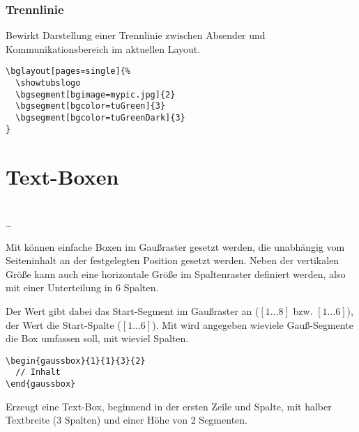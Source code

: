 \subsubsection{Trennlinie}

\vspace*{-5mm}
\begin{Declaration}
\end{Declaration}

Bewirkt Darstellung einer Trennlinie zwischen Absender und Kommunikationsbereich
im aktuellen Layout.

\begin{lstlisting}[captionpos=b,caption={Beispiel-Nutzung von bglayout},label=listing:bglayout]
\bglayout[pages=single]{%
  \showtubslogo
  \bgsegment[bgimage=mypic.jpg]{2}
  \bgsegment[bgcolor=tuGreen]{3}
  \bgsegment[bgcolor=tuGreenDark]{3}
}
\end{lstlisting}


\section{Text-Boxen}

\begin{Declaration}
          \\
  \quad\dots\\
\end{Declaration}

Mit  können einfache Boxen im Gaußraster gesetzt werden,
die unabhängig vom Seiteninhalt an der festgelegten Position gesetzt werden.
Neben der vertikalen Größe kann auch eine horizontale Größe im Spaltenraster
definiert werden, also mit einer Unterteilung in 6 Spalten.

Der Wert  gibt dabei das Start-Segment im Gaußraster an
($[1\ldots 8]$ bzw. $[1\ldots6]$),
der Wert  die Start-Spalte ($[1\ldots6]$).
Mit  wird angegeben wieviele Gauß-Segmente die Box umfassen soll,
mit  wieviel Spalten.

\begin{example}\hfill
  \begin{lstlisting}
\begin{gaussbox}{1}{1}{3}{2}
  // Inhalt
\end{gaussbox}
  \end{lstlisting}
  Erzeugt eine Text-Box, beginnend in der ersten Zeile und Spalte,
  mit halber Textbreite (3 Spalten) und einer Höhe von 2 Segmenten.
\end{example}

